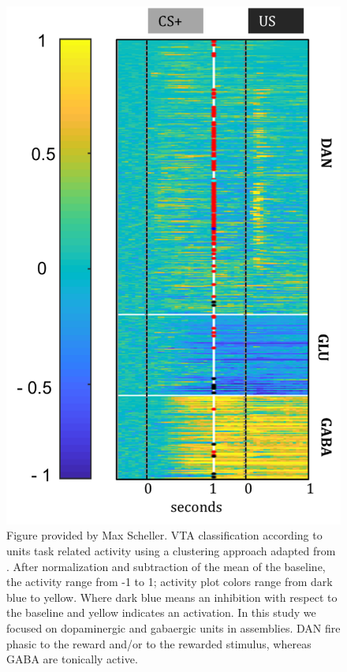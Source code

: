 \begin{figure}[H]
  \centering
    \includegraphics[scale=0.5]{figures/VTA_CellClass.png}
   \caption{Figure provided by Max Scheller. VTA classification according to units task related activity using a clustering approach adapted from \cite{Uchida}. After normalization and subtraction of the mean of the baseline, the activity range from -1 to 1; activity plot colors range from dark blue to yellow. Where dark blue means an inhibition with respect to the baseline and yellow indicates an activation. In this study we focused on dopaminergic and gabaergic units in assemblies. DAN fire phasic to the reward and/or to the rewarded stimulus, whereas GABA are tonically active.}
    \label{fig:ClassificatonVTA}
\end{figure}
